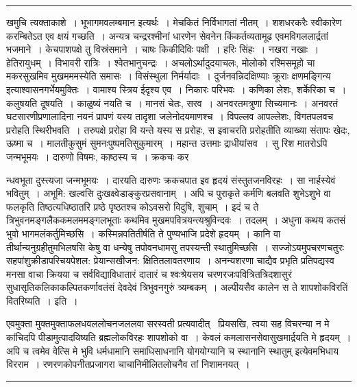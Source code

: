 \documentclass[11pt, openany]{book}
\begin{document}
\vspace{2mm}
\hrule

\noindent
{\s खमुचि त्यक्ताकाशे~। भूभागमवलम्बमान इत्यर्थः~। मेचकितं निर्विभागतां नीतम्~। शशधरकरैः स्वीकारेण करम्बितेऽत एव क्षयं गच्छति~। अन्यत्र चन्द्ररश्मीनां धारणेन सेवनेन किंकर्तव्यतामूढ एवमविगललार्द्रतां भजमाने~। केचपाशपक्षे तु विस्रंसमाने~। चाषः किकीदिविः पक्षी~। हरिः सिंहः~। नखरा नखाः~। हेतिरायुधम्~। विभावरी रात्रिः~। श्वेतभानुचन्द्रः~। अचलोऽर्थादुदयाचलः, मोलोको रश्मिसमूहो चा मकरसुखमिव मुखमममस्येति समासः~। विसंस्थुला निर्मर्यादाः~। दुर्जनवन्निदक्षिण्याः क्रूराः क्षणमङ्गिन्य इत्याश्वासनगर्भेयमुक्तिः~। वामाश्य स्त्रिय ईदृश्य एव~। निकारः परिभवः~। कणिका लेशः, शर्केरिका च~। कलुषयति दूषयति~। काळुष्यं नयति च~। मानसं चेतः, सरव~। अनवरतमत्रुणा सिच्यमानः~। अनवरतं घटसारणीप्रणालादिना नयनं प्रापणं यस्य तादृशा जलेनोदयमाणश्च~। विपल्लव आपल्लेशः, विगतपलवच प्ररोहति स्थिरीभवति~। तरुपक्षे प्ररोहा वि यन्ते यस्य स प्ररोहः, स इवाचरति प्ररोहतीति व्याख्या संतापः खेदः, ऊष्मा च~। मालतीकुसुमं सुमनःपुष्पमतिसुकुमारम्~। महान्त उत्तमाः द्राधीयांसव~। सु रिश मातरोऽपि जन्मभूमयः~। दारुणो विषमः, काष्ठस्य च~। क्रकचः कर\textendash }

\newpage

\noindent
न्धवभूता दुस्त्यजा जन्मभूमयः~। दारयति दारुणः क्रकचपात इव हृदयं संस्तुतजनविरहः~। सा नार्हस्येवं भवितुम्~। अभूमि: खल्वसि दुःखक्ष्वेडाङ्कुरप्रसवानाम्~। अपि च पुराकृते कर्मणि बलवति शुभेऽशुभे वा फलकृति तिष्ठत्यधिष्ठातरि प्रष्ठे पृष्ठतश्च कोऽवसरो विदुषि, शुचाम्~। इदं च ते त्रिभुवनमङ्गलैककमलममङ्गलभूताः कथमिव मुखमपवित्रयन्त्यश्रुविन्दवः~। तदलम्~। अधुना कथय कतसं भुवो भागमलंकर्तुमिच्छसि~। कस्मिन्नवतितीर्षति ते पुण्यभाजि प्रदेशे हृदयम्~। कानि वा तीर्थान्यनुग्रहीतुमभिलषसि केषु वा धन्येषु तपोवनधामसु तपस्यन्ती स्थातुमिच्छसि~। सज्जोऽयमुपचरणचतुरः सहपांशुक्रीडापरिचयपेशल: प्रेयान्सखीजन: क्षितितलावतरणाय~। अनन्यशरणा चाद्यैव प्रभृति प्रतिपद्यस्व मनसा वाचा क्रियया च सर्वविद्याविधातारं दातारं च श्वःश्रेयसय चरणरजःपवित्रितत्रिदशासुरं सुधासृतिकलिकाकल्पितकर्णावतंसं देवदेवं त्रिभुवनगुरुं त्र्यम्बकम्~। अल्पीयसैव कालेन स ते शापशोकविरतिं वितरिष्यति~। इति~।

एवमुक्ता मुक्तमुक्ताफलधवललोचनजललवा सरस्वती प्रत्यवादीत् \textendash\ प्रियसखि, त्वया सह विचरन्या न मे कांचिदपि पीडामुत्पादयिष्यति ब्रह्मलोकविरहः शापशोको वा~। केवलं कमलासनसेवासुखमार्द्रयति मे हृदयम्~। अपि च त्वमेव वेत्सि मे भुवि धर्मधामानि समाधिसाधनानि योगयोग्यानि च स्थानानि स्थातुम् इत्येवमभिधाय विरराम~। रणरणकोपनीतप्रजागरा चाचानिमीलितलोचनैव तां निशामनयत्~।

\vspace{2mm}
\hrule
\end{document}
